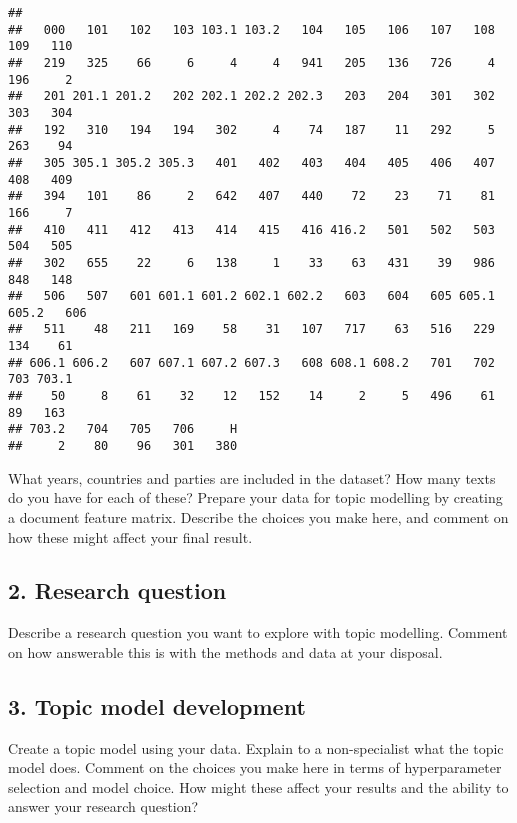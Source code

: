 \documentclass[
]{article}
\begin{document}
\begin{verbatim}
## 
##   000   101   102   103 103.1 103.2   104   105   106   107   108   109   110 
##   219   325    66     6     4     4   941   205   136   726     4   196     2 
##   201 201.1 201.2   202 202.1 202.2 202.3   203   204   301   302   303   304 
##   192   310   194   194   302     4    74   187    11   292     5   263    94 
##   305 305.1 305.2 305.3   401   402   403   404   405   406   407   408   409 
##   394   101    86     2   642   407   440    72    23    71    81   166     7 
##   410   411   412   413   414   415   416 416.2   501   502   503   504   505 
##   302   655    22     6   138     1    33    63   431    39   986   848   148 
##   506   507   601 601.1 601.2 602.1 602.2   603   604   605 605.1 605.2   606 
##   511    48   211   169    58    31   107   717    63   516   229   134    61 
## 606.1 606.2   607 607.1 607.2 607.3   608 608.1 608.2   701   702   703 703.1 
##    50     8    61    32    12   152    14     2     5   496    61    89   163 
## 703.2   704   705   706     H 
##     2    80    96   301   380
\end{verbatim}

What years, countries and parties are included in the dataset? How many
texts do you have for each of these? Prepare your data for topic
modelling by creating a document feature matrix. Describe the choices
you make here, and comment on how these might affect your final result.

\hypertarget{research-question}{%
\subsection{2. Research question}\label{research-question}}

Describe a research question you want to explore with topic modelling.
Comment on how answerable this is with the methods and data at your
disposal.

\hypertarget{topic-model-development}{%
\subsection{3. Topic model development}\label{topic-model-development}}

Create a topic model using your data. Explain to a non-specialist what
the topic model does. Comment on the choices you make here in terms of
hyperparameter selection and model choice. How might these affect your
results and the ability to answer your research question?
\end{document}
